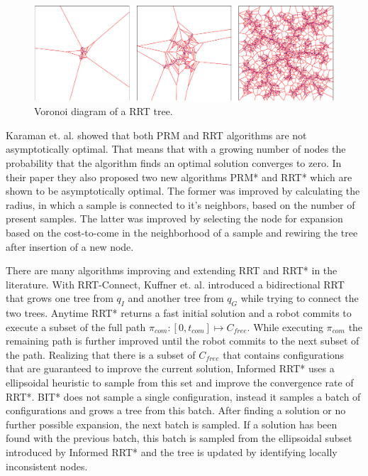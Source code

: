 \documentclass[11pt,twocolumn]{article}
\begin{document}
\begin{figure}[h] \centering \includegraphics[scale=.275]{rrt_voronoi}
  \caption{Voronoi diagram of a RRT tree.}
  \label{fig:rrt}
\end{figure}

Karaman et. al. \cite{karamanSamplingbasedAlgorithmsOptimal2011}
showed that both PRM and RRT algorithms are not asymptotically
optimal. That means that with a growing number of nodes the
probability that the algorithm finds an optimal solution converges to
zero. In their paper they also proposed two new algorithms PRM* and
RRT* which are shown to be asymptotically optimal. The former was
improved by calculating the radius, in which a sample is connected to
it's neighbors, based on the number of present samples. The latter was
improved by selecting the node for expansion based on the cost-to-come
in the neighborhood of a sample and rewiring the tree after insertion
of a new node.

There are many algorithms improving and extending RRT and RRT* in the
literature. With RRT-Connect, Kuffner et. al.
\cite{kuffnerRRTConnectEfficientApproach} introduced a bidirectional
RRT that grows one tree from \(q_I\) and another tree from \(q_G\)
while trying to connect the two trees. Anytime RRT*
\cite{karamanAnytimeMotionPlanning2011} returns a fast initial
solution and a robot commits to execute a subset of the full path
\(\pi_{com}: [0, t_{com}] \mapsto C_{free}\). While executing
\(\pi_{com}\) the remaining path is further improved until the robot
commits to the next subset of the path. Realizing that there is a
subset of \(C_{free}\) that contains configurations that are
guaranteed to improve the current solution, Informed RRT*
\cite{gammellInformedRRTOptimal2014} uses a ellipsoidal heuristic to
sample from this set and improve the convergence rate of RRT*. BIT*
\cite{gammellBatchInformedTrees2015} does not sample a single
configuration, instead it samples a batch of configurations and grows
a tree from this batch.  After finding a solution or no further
possible expansion, the next batch is sampled. If a solution has been
found with the previous batch, this batch is sampled from the
ellipsoidal subset introduced by Informed RRT* and the tree is updated
by identifying locally inconsistent nodes.
\end{document}
